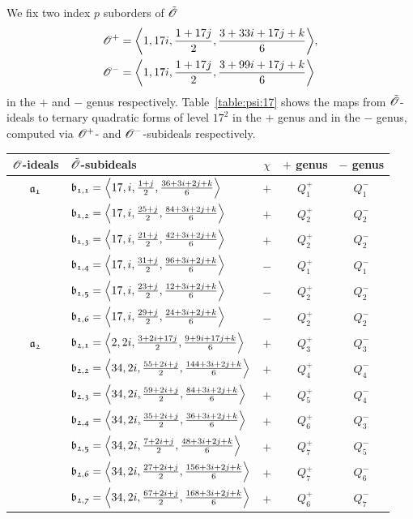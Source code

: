 We fix two index $p$ suborders of ${\tilde{{\mathscr{O}}}}$
\begin{align*}
  \Ops & = \<1,17i,\frac{1+17j}{2},\frac{3+33i+17j+k}{6}>, \\
  \Ons & = \<1,17i,\frac{1+17j}{2},\frac{3+99i+17j+k}{6}>
\end{align*}
in the $+$ and $-$ genus respectively.
Table~\ref{table:psi:17} shows the maps from ${\tilde{{\mathscr{O}}}}$-ideals
to ternary quadratic forms of level $17^2$ in the $+$ genus
and in the $-$ genus, computed via ${{\mathscr{O}}^+}$- and ${{\mathscr{O}}^-}$-subideals respectively.
\begin{table}
\begin{tabular}{|c|l|c|c|c|}
\hline
${\mathscr{O}}$-ideals & ${\tilde{{\mathscr{O}}}}$-subideals & $\chi$ & $+$ genus & $-$ genus \\
\hline\hline
${\mathfrak{a_{1}}}$ & $\id{b_{1,1}}=\<17,i,\frac{1+j}{2},\frac{36+3i+2j+k}{6}>$ & $+$ & $Q_{1}^{+}$ & $Q_{1}^{-}$\\
 & $\id{b_{1,2}}=\<17,i,\frac{25+j}{2},\frac{84+3i+2j+k}{6}>$ & $+$ & $Q_{2}^{+}$ & $Q_{2}^{-}$\\
 & $\id{b_{1,3}}=\<17,i,\frac{21+j}{2},\frac{42+3i+2j+k}{6}>$ & $+$ & $Q_{2}^{+}$ & $Q_{2}^{-}$\\
 & $\id{b_{1,4}}=\<17,i,\frac{31+j}{2},\frac{96+3i+2j+k}{6}>$ & $-$ & $Q_{1}^{+}$ & $Q_{1}^{-}$\\
 & $\id{b_{1,5}}=\<17,i,\frac{23+j}{2},\frac{12+3i+2j+k}{6}>$ & $-$ & $Q_{2}^{+}$ & $Q_{2}^{-}$\\
 & $\id{b_{1,6}}=\<17,i,\frac{29+j}{2},\frac{24+3i+2j+k}{6}>$ & $-$ & $Q_{2}^{+}$ & $Q_{2}^{-}$\\
\hline
${\mathfrak{a_{2}}}$ & $\id{b_{2,1}}=\<2,2i,\frac{3+2i+17j}{2},\frac{9+9i+17j+k}{6}>$ & $+$ & $Q_{3}^{+}$ & $Q_{3}^{-}$\\
 & $\id{b_{2,2}}=\<34,2i,\frac{55+2i+j}{2},\frac{144+3i+2j+k}{6}>$ & $+$ & $Q_{4}^{+}$ & $Q_{4}^{-}$\\
 & $\id{b_{2,3}}=\<34,2i,\frac{59+2i+j}{2},\frac{84+3i+2j+k}{6}>$ & $+$ & $Q_{5}^{+}$ & $Q_{4}^{-}$\\
 & $\id{b_{2,4}}=\<34,2i,\frac{35+2i+j}{2},\frac{36+3i+2j+k}{6}>$ & $+$ & $Q_{6}^{+}$ & $Q_{3}^{-}$\\
 & $\id{b_{2,5}}=\<34,2i,\frac{7+2i+j}{2},\frac{48+3i+2j+k}{6}>$ & $+$ & $Q_{7}^{+}$ & $Q_{5}^{-}$\\
 & $\id{b_{2,6}}=\<34,2i,\frac{27+2i+j}{2},\frac{156+3i+2j+k}{6}>$ & $+$ & $Q_{7}^{+}$ & $Q_{6}^{-}$\\
 & $\id{b_{2,7}}=\<34,2i,\frac{67+2i+j}{2},\frac{168+3i+2j+k}{6}>$ & $+$ & $Q_{6}^{+}$ & $Q_{7}^{-}$\\

\end{tabular}
\end{table}

